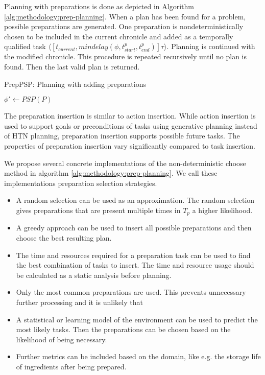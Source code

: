 Planning with preparations is done as depicted in Algorithm \ref{alg:methodology:prep-planning}.
When a plan has been found for a problem, possible preparations are generated.
One preparation is nondeterministically chosen to be included in the current chronicle and added as a temporally qualified task $\langle[t_{current}, mindelay(\phi,t^p_{start}, t^p_{end})] \tau \rangle$.
Planning is continued with the modified chronicle.
This procedure is repeated recursively until no plan is found.
Then the last valid plan is returned.

\begin{algorithm}
    \caption{PrepPSP: Planning with adding preparations}
    \label{alg:methodology:prep-planning}
    $\phi' \leftarrow PSP(P)$\;
\end{algorithm}

The preparation insertion is similar to action insertion.
While action insertion is used to support goals or preconditions of tasks using generative planning instead of HTN planning, preparation insertion supports possible future tasks.
The properties of preparation insertion vary significantly compared to task insertion.

We propose several concrete implementations of the non-deterministic choose method in algorithm \ref{alg:methodology:prep-planning}.
We call these implementations preparation selection strategies.

\begin{itemize}
  \item A random selection can be used as an approximation.
    The random selection gives preparations that are present multiple times in $T_p$ a higher likelihood.
  \item A greedy approach can be used to insert all possible preparations and then choose the best resulting plan.
  \item The time and resources required for a preparation task can be used to find the best combination of tasks to insert.
  The time and resource usage should be calculated as a static analysis before planning.
  \item Only the most common preparations are used.
    This prevents unnecessary further processing and it is unlikely that 
  \item A statistical or learning model of the environment can be used to predict the most likely tasks.
    Then the preparations can be chosen based on the likelihood of being necessary.
  \item Further metrics can be included based on the domain, like e.g. the storage life of ingredients after being prepared.
\end{itemize}
